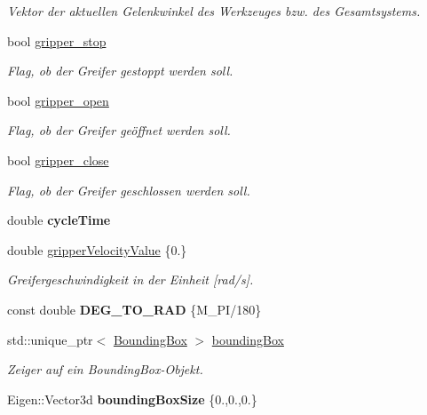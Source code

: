 \begin{DoxyCompactItemize}
\begin{DoxyCompactList}\small\item\em Vektor der aktuellen Gelenkwinkel des Werkzeuges bzw. des Gesamtsystems. \end{DoxyCompactList}\item 
bool \hyperlink{classICommander_a1b8886169747ff21c2bab443e1e10eb2}{gripper\-\_\-stop}
\begin{DoxyCompactList}\small\item\em Flag, ob der Greifer gestoppt werden soll. \end{DoxyCompactList}\item 
bool \hyperlink{classICommander_aa9a42ff9cb09194140ae0da24399a41f}{gripper\-\_\-open}
\begin{DoxyCompactList}\small\item\em Flag, ob der Greifer geöffnet werden soll. \end{DoxyCompactList}\item 
bool \hyperlink{classICommander_abe4d559901acda2eb5ac159be812b85e}{gripper\-\_\-close}
\begin{DoxyCompactList}\small\item\em Flag, ob der Greifer geschlossen werden soll. \end{DoxyCompactList}\item 
\hypertarget{classICommander_aaf214207db2edcd8f663ecbd9a593b86}{double {\bfseries cycle\-Time}}\label{classICommander_aaf214207db2edcd8f663ecbd9a593b86}

\item 
\hypertarget{classICommander_a7ed8870f46e2138a7cc4bf9f3709e9f8}{double \hyperlink{classICommander_a7ed8870f46e2138a7cc4bf9f3709e9f8}{gripper\-Velocity\-Value} \{0.\}}\label{classICommander_a7ed8870f46e2138a7cc4bf9f3709e9f8}

\begin{DoxyCompactList}\small\item\em Greifergeschwindigkeit in der Einheit \mbox{[}rad/s\mbox{]}. \end{DoxyCompactList}\item 
\hypertarget{classICommander_a08933d01e147310671495c100a138704}{const double {\bfseries D\-E\-G\-\_\-\-T\-O\-\_\-\-R\-A\-D} \{M\-\_\-\-P\-I/180\}}\label{classICommander_a08933d01e147310671495c100a138704}

\item 
std\-::unique\-\_\-ptr$<$ \hyperlink{classBoundingBox}{Bounding\-Box} $>$ \hyperlink{classICommander_ab0d02021fcc73daaebcfe0a826e15f50}{bounding\-Box}
\begin{DoxyCompactList}\small\item\em Zeiger auf ein Bounding\-Box-\/\-Objekt. \end{DoxyCompactList}\item 
\hypertarget{classICommander_ae6ca762d9b45d0887b1b9b3d5effb2f4}{Eigen\-::\-Vector3d {\bfseries bounding\-Box\-Size} \{0.,0.,0.\}}\label{classICommander_ae6ca762d9b45d0887b1b9b3d5effb2f4}


\end{DoxyCompactItemize}
